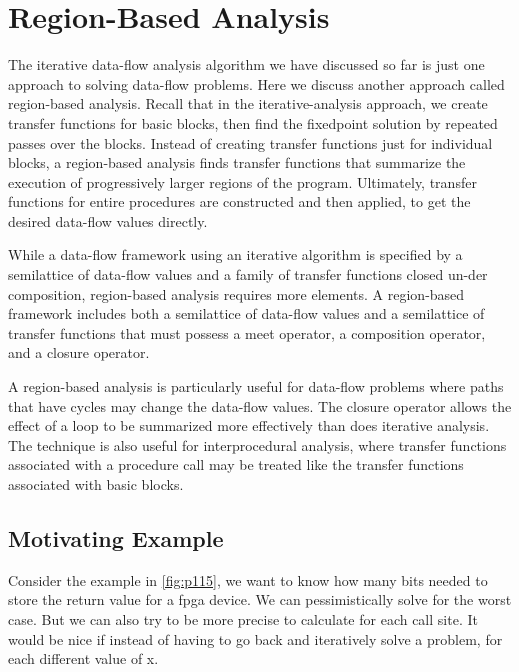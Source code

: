 \newpage

\section{Region-Based Analysis}

The iterative data-flow analysis algorithm we have discussed so far is just one approach to solving data-flow problems.
Here we discuss another approach called region-based analysis\cite{Microsof22:online}. Recall that in the iterative-analysis approach,
we create transfer functions for basic blocks, then find the fixedpoint solution by repeated passes over the blocks.
Instead of creating transfer functions just for individual blocks, a region-based analysis finds transfer functions that
summarize the execution of progressively larger regions of the program. Ultimately, transfer functions for entire procedures are constructed
and then applied, to get the desired data-flow values directly.



While a data-flow framework using an iterative algorithm is specified by a semilattice of data-flow values and a family of transfer
functions closed un-der composition, region-based analysis requires more elements. A region-based framework includes both a semilattice
of data-flow values and a semilattice of transfer functions that must possess a meet operator, a composition operator,
and a closure operator.

A region-based analysis is particularly useful for data-flow problems where paths that have cycles may change the data-flow values.
The closure operator allows the effect of a loop to be summarized more effectively than does iterative analysis.
The technique is also useful for interprocedural analysis, where transfer functions associated with a procedure call may be treated like
the transfer functions associated with basic blocks.

\subsection{Motivating Example}

Consider the example in \ref{fig:p115}, we want to know how many bits needed to store the return value for a fpga device. We can pessimistically solve for the worst case.
But we can also try to be more precise to calculate for each call site. It would be nice if instead of having to go back and iteratively solve a problem, for each different value of x.



